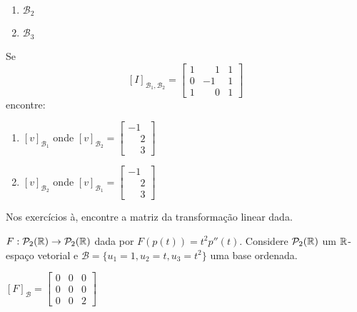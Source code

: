 \documentclass[12pt]{exam}
\begin{document}
\begin{exercicio}
\begin{enumerate}[label={\alph*})]
\begin{enumerate}[label={\roman*})]
            \item $\mathcal{B}_2$

            \item $\mathcal{B}_3$
        \end{enumerate}
    \end{enumerate}
\end{exercicio}

\begin{exercicio}
    Se
    \[
    [I]_{\mathcal{B}_1,\mathcal{B}_2} = \begin{bmatrix}
        1 & \phantom{-}1 & 1\\
        0 & -1 & 1\\
        1 & \phantom{-}0 & 1
    \end{bmatrix}
    \]
    encontre:
    \begin{enumerate}[label={\alph*})]
        \item $[v]_{\mathcal{B}_1}$ onde $[v]_{\mathcal{B}_2} = \begin{bmatrix}
            -1\\\phantom{-}2\\\phantom{-}3
        \end{bmatrix}$

        \item $[v]_{\mathcal{B}_2}$ onde $[v]_{\mathcal{B}_1} = \begin{bmatrix}
            -1\\\phantom{-}2\\\phantom{-}3
        \end{bmatrix}$
    \end{enumerate}
\end{exercicio}

    Nos exercícios à, encontre a matriz da transformação linear dada.

\begin{exercicio}
    $F : \mathcal{P}_2(\mathbb{R}) \to \mathcal{P}_2(\mathbb{R})$ dada por $F(p(t)) = t^2p''(t)$. Considere $\mathcal{P}_2(\mathbb{R})$ um $\mathbb{R}$-espaço vetorial e $\mathcal{B} = \{u_1 = 1, u_2 = t, u_3 = t^2\}$ uma base ordenada.

    \begin{solucao}
        $[F]_\mathcal{B} = \begin{bmatrix}
                0 & 0 & 0\\
                0 & 0 & 0\\
                0 & 0 & 2
            \end{bmatrix}$
      \end{solucao}
\end{exercicio}
\end{document}
